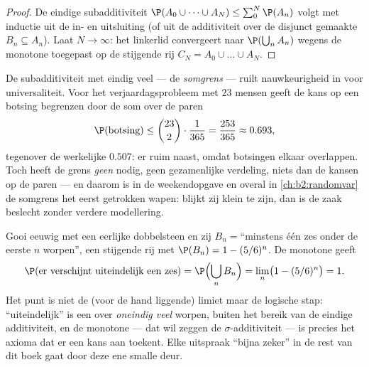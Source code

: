 \begin{proof}
De eindige subadditiviteit $\P(A_0 \cup \dots \cup A_N) \leq
\sum_0^N \P(A_n)$ volgt met inductie uit de in- en uitsluiting (of
uit de additiviteit over de disjunct gemaakte $B_n \subseteq
A_n$). Laat $N \to \infty$: het linkerlid convergeert naar
$\P(\bigcup_n A_n)$ wegens de monotone  toegepast op de
stijgende rij $C_N = A_0 \cup \dots \cup A_N$.
\end{proof}

\begin{example}\label{ex:b2:proba:unionbound}
De subadditiviteit met eindig veel  --- de
\emph{somgrens} --- ruilt nauwkeurigheid in voor universaliteit.
Voor het verjaardagsprobleem met $23$ mensen geeft de kans op een
botsing begrenzen door de som over de paren
\[
\P(\text{botsing}) \leq \binom{23}2\cdot\frac1{365}
= \frac{253}{365} \approx 0.693 ,
\]
tegenover de werkelijke $0.507$: er ruim naast, omdat botsingen
elkaar overlappen. Toch heeft de grens \emph{geen}
 nodig, geen gezamenlijke verdeling, niets dan de
kansen op de paren --- en daarom is in de weekendopgave en overal
in \cref{ch:b2:randomvar} de somgrens het eerst getrokken wapen:
blijkt zij klein te zijn, dan is de zaak beslecht zonder verdere
modellering.
\end{example}

\begin{example}\label{ex:b2:proba:sixeventually}
Gooi eeuwig met een eerlijke dobbelsteen en zij $B_n = {}$``minstens
één zes onder de eerste $n$ worpen'', een stijgende rij
 met $\P(B_n) = 1 - (5/6)^n$. De monotone
 geeft
\[
\P(\text{er verschijnt uiteindelijk een zes})
= \P\Bigl(\bigcup_nB_n\Bigr)
= \lim_n\bigl(1 - (5/6)^n\bigr) = 1 .
\]
Het punt is niet de (voor de hand liggende) limiet maar de logische
stap: ``uiteindelijk'' is een  over \emph{oneindig veel}
worpen, buiten het bereik van de eindige additiviteit, en de
monotone  --- dat wil zeggen de $\sigma$-additiviteit
--- is precies het axioma dat er een kans aan toekent. Elke uitspraak
``bijna zeker'' in de rest van dit boek gaat door deze ene smalle
deur.
\end{example}

